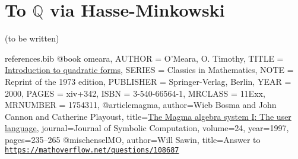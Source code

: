 \documentclass[10pt,a4paper]{amsart}
\numberwithin{equation}{section}
\numberwithin{figure}{section}
\theoremstyle{definition}
\theoremstyle{remark}
\theoremstyle{plain}
\theoremstyle{plain}
\theoremstyle{definition}
\theoremstyle{plain}
\theoremstyle{plain}
\begin{document}
    \section{To $\mathbb{Q}$ via Hasse-Minkowski} 
    \label{sec:hasse-minkowski}
    
    (to be written)

\begin{filecontents}{references.bib}
@book {omeara,
    AUTHOR = {O'Meara, O. Timothy},
     TITLE = {\href{https://link.springer.com/book/10.1007\%2F978-3-642-62031-7}{Introduction to quadratic forms}},
    SERIES = {Classics in Mathematics},
      NOTE = {Reprint of the 1973 edition},
 PUBLISHER = {Springer-Verlag, Berlin},
      YEAR = {2000},
     PAGES = {xiv+342},
      ISBN = {3-540-66564-1},
   MRCLASS = {11Exx},
  MRNUMBER = {1754311},
}
@article{magma,
author={Wieb Bosma and John Cannon and Catherine Playoust},
title={\href{http://www.sciencedirect.com/science/article/pii/S074771719690125X}{The Magma algebra system {I}: The user language}},
journal={Journal of Symbolic Computation},
volume={24},
year={1997},
pages={235--265}
}
@misc{henselMO,
	author={Will Sawin},
	title={Answer to \href{https://mathoverflow.net/questions/108687}{\texttt{https://mathoverflow.net/questions/108687}}}
}
\end{filecontents}



\end{document}
